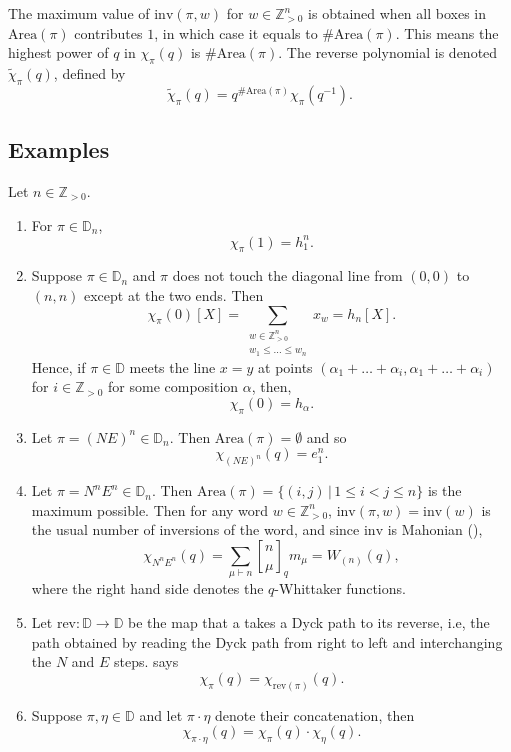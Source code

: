 \documentclass[12pt,reqno]{amsart}
\theoremstyle{plain}
\theoremstyle{definition}
\theoremstyle{remark}
\theoremstyle{example}
\numberwithin{equation}{section}
\newcommand\ZZ{\mathbb{Z}}
\newcommand\inv{\mathrm{inv}}
\newcommand{\rev}{\mathrm{rev}}
\newcommand{\Area}{\mathrm{Area}}
\newcommand{\DD}{\mathbb{D}}
\begin{document}
The maximum value of $\inv(\pi,w)$ for $w\in \ZZ_{>0}^n$ is obtained when all boxes in $\Area(\pi)$ contributes $1$, in which case it equals to $\#\Area(\pi)$. This means the highest power of $q$ in $\chi_\pi(q)$ is $\#\Area(\pi)$. The reverse polynomial is denoted $\widetilde{\chi}_\pi(q)$, defined by \begin{equation}\label{eq:tildechidef}
	\widetilde{\chi}_\pi(q) = q^{\# \Area(\pi)} \chi_\pi(q^{-1}).
\end{equation} 

\subsection{Examples}
Let $n \in \ZZ_{>0}$. 
\begin{enumerate}
	\item For $\pi \in \DD_n$, $$ \chi_\pi(1) = h_1^n.$$
	\item Suppose $\pi \in \DD_n$ and $\pi$ does not touch the diagonal line from $(0,0)$ to $(n,n)$ except at the two ends. Then $$\chi_\pi(0)[X] = \sum_{\substack{w \in \ZZ_{>0}^n \\ w_1 \leq \ldots \leq w_n}} x_w = h_n[X].$$ Hence, if $\pi \in \DD$ meets the line $x=y$ at points $(\alpha_1+\ldots+\alpha_i,\alpha_1+\ldots+\alpha_i)$ for $i \in \ZZ_{>0}$ for some composition $\alpha$, then, $$ \chi_\pi(0) = h_\alpha.$$
	\item Let $\pi = (NE)^n \in \DD_n$. Then $\Area(\pi) = \emptyset$ and so $$ \chi_{(NE)^n}(q) = e_1^n.$$ 
	\item Let $\pi = N^nE^n \in \DD_n$. Then $\Area(\pi) = \{(i,j)\,|\, 1 \leq i < j \leq  n\}$ is the maximum possible. Then for any word $w \in \ZZ_{>0}^n$, $\inv(\pi,w) = \inv(w)$ is the usual number of inversions of the word, and since $\inv$ is Mahonian (\cite[Theorem 1.3]{HaglundqtCatbook}), $$ \chi_{N^nE^n}(q) = \sum_{\mu \vdash n} {n \brack \mu}_q m_\mu = W_{(n)}(q),$$ where the right hand side denotes the $q$-Whittaker functions.
	
	\item Let $\rev : \DD \to \DD$ be the map that a takes a Dyck path to its reverse, i.e, the path obtained by reading the Dyck path from right to left and interchanging the $N$ and $E$ steps. 
	\cite[Proposition 3.3]{Carlsson-Mellit-Shuffle} says
	\begin{equation}
		\chi_\pi(q) = \chi_{\rev(\pi)}(q).
	\end{equation}
	
	\item Suppose $\pi,\eta \in \DD$ and let $\pi \cdot \eta$ denote their concatenation, then $$ \chi_{\pi \cdot \eta}(q) = \chi_\pi(q) \cdot \chi_\eta(q).$$
\end{enumerate}
\end{document}
